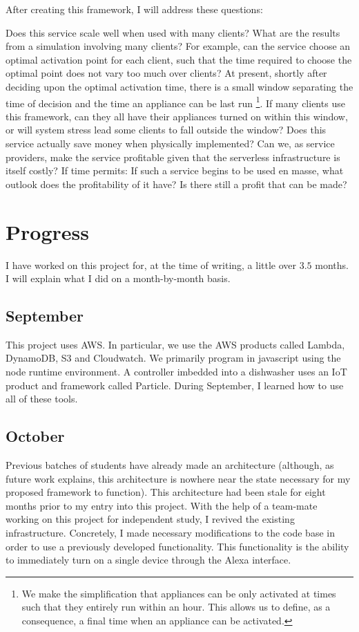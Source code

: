 \documentclass[a4paper]{article}
\begin{document}
After creating this framework, I will address these questions:

\begin{outline}
    \1 Does this service scale well when used with many clients? What are the
    results from a simulation involving many clients?
    \2 For example, can the service choose an optimal activation point for each client, such
    that the time required to choose the optimal point does not vary too much over clients?
    \2 At present, shortly after deciding upon the optimal activation time, there is a small
    window separating the time of decision and the time an appliance can be last run \footnote{We make the simplification that appliances can be only activated at times such that they entirely run within an hour. This allows us to define, as a consequence, a final time when an appliance can be activated.}. If many clients use this framework, can they all have their appliances turned on within this window, or will system stress lead some clients to fall outside the window?
    \1 Does this service actually save money when physically implemented? Can we, as service providers, make the service profitable given that the serverless infrastructure is itself costly?
    \1 If time permits: If such a service begins to be used en masse, what
    outlook does the profitability of it have? Is there still a profit that can be made?
\end{outline}


\section{Progress}
I have worked on this project for, at the time of writing, a little over $3.5$ months. I will explain what I did on a month-by-month basis.

\subsection{September}
This project uses AWS. In particular, we use the AWS products called Lambda, DynamoDB, S3 and Cloudwatch. We primarily program in javascript using the node runtime environment. A controller imbedded into a dishwasher uses an IoT product and framework called Particle. During September, I learned how to use all of these tools.

\subsection{October}
Previous batches of students have already made an architecture (although, as future work explains, this architecture is nowhere near the state necessary for my proposed framework to function). This architecture had been stale for eight months prior to my entry into this project. With the help of a team-mate working on this project for independent study, I revived the existing infrastructure. Concretely, I made necessary modifications to the code base in order to use a previously developed functionality. This functionality is the ability to immediately turn on a single device through the Alexa interface.
\end{document}
